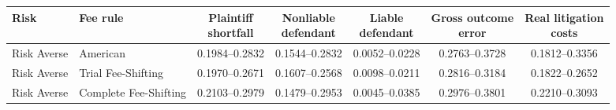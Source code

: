\documentclass[10pt,border=5pt]{standalone}
\begin{document}
\begin{tabular}{llccccc}
\toprule Risk & Fee rule & \shortstack{Plaintiff\\shortfall} & \shortstack{Nonliable\\defendant} & \shortstack{Liable\\defendant} & \shortstack{Gross outcome\\error} & \shortstack{Real litigation\\costs} \\
\midrule
Risk Averse & American & 0.1984--0.2832 & 0.1544--0.2832 & 0.0052--0.0228 & 0.2763--0.3728 & 0.1812--0.3356 \\
Risk Averse & Trial Fee-Shifting & 0.1970--0.2671 & 0.1607--0.2568 & 0.0098--0.0211 & 0.2816--0.3184 & 0.1822--0.2652 \\
Risk Averse & Complete Fee-Shifting & 0.2103--0.2979 & 0.1479--0.2953 & 0.0045--0.0385 & 0.2976--0.3801 & 0.2210--0.3093 \\
\bottomrule\end{tabular}
\end{document}
